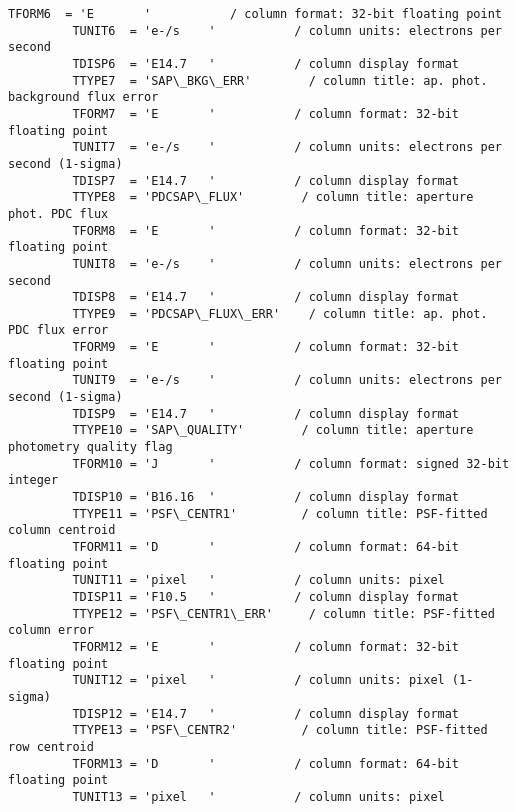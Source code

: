 \documentclass[11pt]{article}
\begin{document}
\begin{Verbatim}[commandchars=\\\{\}]
         TFORM6  = 'E       '           / column format: 32-bit floating point           
         TUNIT6  = 'e-/s    '           / column units: electrons per second             
         TDISP6  = 'E14.7   '           / column display format                          
         TTYPE7  = 'SAP\_BKG\_ERR'        / column title: ap. phot. background flux error  
         TFORM7  = 'E       '           / column format: 32-bit floating point           
         TUNIT7  = 'e-/s    '           / column units: electrons per second (1-sigma)   
         TDISP7  = 'E14.7   '           / column display format                          
         TTYPE8  = 'PDCSAP\_FLUX'        / column title: aperture phot. PDC flux          
         TFORM8  = 'E       '           / column format: 32-bit floating point           
         TUNIT8  = 'e-/s    '           / column units: electrons per second             
         TDISP8  = 'E14.7   '           / column display format                          
         TTYPE9  = 'PDCSAP\_FLUX\_ERR'    / column title: ap. phot. PDC flux error         
         TFORM9  = 'E       '           / column format: 32-bit floating point           
         TUNIT9  = 'e-/s    '           / column units: electrons per second (1-sigma)   
         TDISP9  = 'E14.7   '           / column display format                          
         TTYPE10 = 'SAP\_QUALITY'        / column title: aperture photometry quality flag 
         TFORM10 = 'J       '           / column format: signed 32-bit integer           
         TDISP10 = 'B16.16  '           / column display format                          
         TTYPE11 = 'PSF\_CENTR1'         / column title: PSF-fitted column centroid       
         TFORM11 = 'D       '           / column format: 64-bit floating point           
         TUNIT11 = 'pixel   '           / column units: pixel                            
         TDISP11 = 'F10.5   '           / column display format                          
         TTYPE12 = 'PSF\_CENTR1\_ERR'     / column title: PSF-fitted column error          
         TFORM12 = 'E       '           / column format: 32-bit floating point           
         TUNIT12 = 'pixel   '           / column units: pixel (1-sigma)                  
         TDISP12 = 'E14.7   '           / column display format                          
         TTYPE13 = 'PSF\_CENTR2'         / column title: PSF-fitted row centroid          
         TFORM13 = 'D       '           / column format: 64-bit floating point           
         TUNIT13 = 'pixel   '           / column units: pixel                            

\end{Verbatim}
\end{document}
